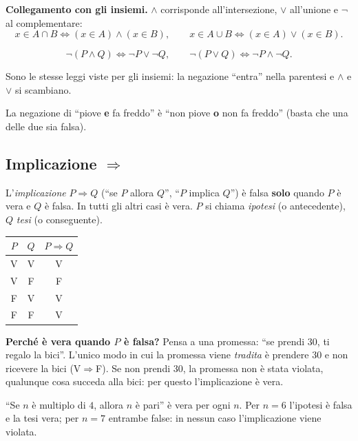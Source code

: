 \documentclass[11pt,a4paper]{article}
\newcommand{\V}{\textsf{V}}
\newcommand{\F}{\textsf{F}}
\begin{document}
\textbf{Collegamento con gli insiemi.}
$\land$ corrisponde all'intersezione, $\lor$ all'unione e $\neg$ al
complementare:
\[
x \in A \cap B \iff (x \in A) \land (x \in B), \qquad
x \in A \cup B \iff (x \in A) \lor (x \in B).
\]

\begin{teorema}
\[
\neg(P \land Q) \iff \neg P \lor \neg Q, \qquad
\neg(P \lor Q) \iff \neg P \land \neg Q.
\]
\end{teorema}

Sono le stesse leggi viste per gli insiemi: la negazione ``entra'' nella
parentesi e $\land$ e $\lor$ si scambiano.

\begin{esempio}
La negazione di ``piove \textbf{e} fa freddo'' è ``non piove \textbf{o} non
fa freddo'' (basta che una delle due sia falsa).
\end{esempio}

\subsection{Implicazione $\Rightarrow$}

\begin{definizione}
L'\emph{implicazione} $P \Rightarrow Q$ (``se $P$ allora $Q$'', ``$P$ implica
$Q$'') è falsa \textbf{solo} quando $P$ è vera e $Q$ è falsa. In tutti gli
altri casi è vera. $P$ si chiama \emph{ipotesi} (o antecedente), $Q$
\emph{tesi} (o conseguente).
\end{definizione}

\begin{center}
\begin{tabular}{cc|c}
$P$ & $Q$ & $P \Rightarrow Q$ \\ \hline
\V & \V & \V \\
\V & \F & \F \\
\F & \V & \V \\
\F & \F & \V
\end{tabular}
\end{center}

\textbf{Perché è vera quando $P$ è falsa?} Pensa a una promessa: ``se
prendi 30, ti regalo la bici''. L'unico modo in cui la promessa viene
\emph{tradita} è prendere 30 e non ricevere la bici (\V$\Rightarrow$\F).
Se non prendi 30, la promessa non è stata violata, qualunque cosa succeda
alla bici: per questo l'implicazione è vera.

\begin{esempio}
``Se $n$ è multiplo di $4$, allora $n$ è pari'' è vera per ogni $n$.
Per $n = 6$ l'ipotesi è falsa e la tesi vera; per $n = 7$ entrambe false:
in nessun caso l'implicazione viene violata.
\end{esempio}
\end{document}

